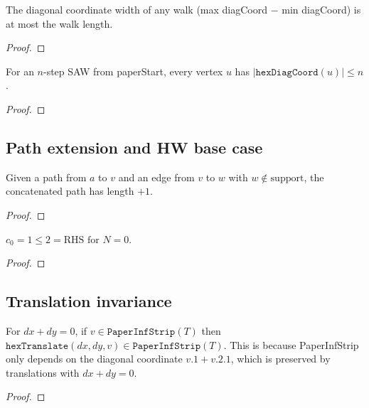 \begin{lemma}
\begin{enumerate}
\begin{lemma}\label{lem:walkDCWidth}
\leanok
  The diagonal coordinate width of any walk
  (max diagCoord $-$ min diagCoord) is at most the walk length.
\end{lemma}
\begin{proof}\leanok\end{proof}

\begin{lemma}\label{lem:saw-dc-bound}
\leanok
  For an $n$-step SAW from paperStart,
  every vertex $u$ has $|\texttt{hexDiagCoord}(u)| \leq n$.
\end{lemma}
\begin{proof}\leanok\end{proof}

\subsection{Path extension and HW base case}

\begin{lemma}\label{lem:extendPath}
\leanok
  Given a path from $a$ to $v$ and an edge from $v$ to $w$ with
  $w \notin \text{support}$, the concatenated path has length $+1$.
\end{lemma}
\begin{proof}\leanok\end{proof}

\begin{lemma}\label{lem:hw-base}
\leanok
  $c_0 = 1 \leq 2 = \text{RHS for } N = 0$.
\end{lemma}
\begin{proof}\leanok\end{proof}

\subsection{Translation invariance}

\begin{lemma}\label{lem:translate-strip}
\leanok
  For $dx + dy = 0$, if $v \in \texttt{PaperInfStrip}(T)$ then
  $\texttt{hexTranslate}(dx, dy, v) \in \texttt{PaperInfStrip}(T)$.
  This is because PaperInfStrip only depends on the diagonal coordinate
  $v.1 + v.2.1$, which is preserved by translations with $dx + dy = 0$.
\end{lemma}
\begin{proof}\leanok\end{proof}


\end{enumerate}
\end{lemma}
